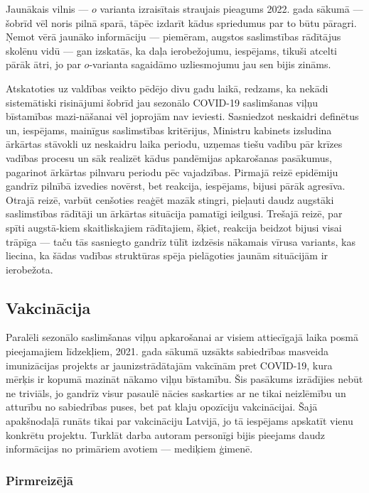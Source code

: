 \documentclass[12pt, a4paper]{article}
\numberwithin{equation}{section} %
\begin{document}
Jaunākais vilnis --- $o$ varianta izraisītais straujais pieagums 2022. gada sākumā --- šobrīd vēl noris pilnā sparā, tāpēc izdarīt kādus spriedumus par to būtu pāragri. Ņemot vērā jaunāko informāciju --- piemēram, augstos saslimstības rādītājus skolēnu vidū \cite{lv_sick_student} --- gan izskatās, ka daļa ierobežojumu, iespējams, tikuši atcelti pārāk ātri, jo par $o$-varianta sagaidāmo uzliesmojumu jau sen bijis zināms.

Atskatoties uz valdības veikto pēdējo divu gadu laikā, redzams, ka nekādi sistemātiski risinājumi šobrīd jau sezonālo COVID-19 saslimšanas viļņu bīstamības mazi-nāšanai vēl joprojām nav ieviesti. Sasniedzot neskaidri definētus un, iespējams, mainīgus saslimstības kritērijus, Ministru kabinets izsludina ārkārtas stāvokli uz neskaidru laika periodu, uzņemas tiešu vadību pār krīzes vadības procesu un sāk realizēt kādus pandēmijas apkarošanas pasākumus, pagarinot ārkārtas pilnvaru periodu pēc vajadzības. Pirmajā reizē epidēmiju gandrīz pilnībā izvedies novērst, bet reakcija, iespējams, bijusi pārāk agresīva. Otrajā reizē, varbūt cenšoties reaģēt mazāk stingri, pieļauti daudz augstāki saslimstības rādītāji un ārkārtas situācija pamatīgi ieilgusi. Trešajā reizē, par spīti augstā-kiem skaitliskajiem rādītajiem, šķiet, reakcija beidzot bijusi visai trāpīga --- taču tās sasniegto gandrīz tūlīt izdzēsis nākamais vīrusa variants, kas liecina, ka šādas vadības struktūras spēja pielāgoties jaunām situācijām ir ierobežota.

\subsection{Vakcinācija}

Paralēli sezonālo saslimšanas viļņu apkarošanai ar visiem attiecīgajā laika posmā pieejamajiem līdzekļiem, 2021. gada sākumā uzsākts sabiedrības masveida imunizācijas projekts ar jaunizstrādātajām vakcīnām pret COVID-19, kura mērķis ir kopumā mazināt nākamo viļņu bīstamību. Šis pasākums izrādījies nebūt ne triviāls, jo gandrīz visur pasaulē nācies saskarties ar ne tikai neizlēmību un atturību no sabiedrības puses, bet pat klaju opozīciju vakcinācijai. Šajā apakšnodaļā runāts tikai par vakcināciju Latvijā, jo tā iespējams apskatīt vienu konkrētu projektu. Turklāt darba autoram personīgi bijis pieejams daudz informācijas no primāriem avotiem --- mediķiem ģimenē.

\subsubsection{Pirmreizējā}
\end{document}
